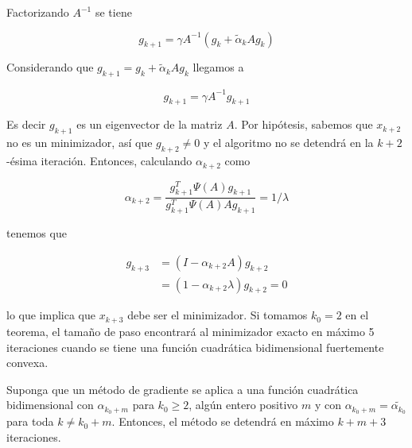 Factorizando $A^{-1}$ se tiene

\begin{equation*}
    g_{k+1} = \gamma A^{-1}(g_k+\tilde{\alpha}_kAg_k)
\end{equation*}

Considerando que $g_{k+1} = g_k+\tilde{\alpha}_kAg_k$ llegamos a

\begin{equation*}
    g_{k+1} = \gamma A^{-1}g_{k+1}
\end{equation*}

Es decir $g_{k+1}$ es un eigenvector de la matriz $A$. Por hipótesis, sabemos que $x_{k+2}$ no es un minimizador, así que $g_{k+2}\neq 0$ y el algoritmo no se detendrá en la $k+2$-ésima iteración. Entonces, calculando $\alpha_{k+2}$ como

\begin{equation*}
    \alpha_{k+2}= \frac{g_{k+1}^T\Psi(A)g_{k+1}}{g_{k+1}^T\Psi(A)Ag_{k+1}} = 1/\lambda
\end{equation*}

tenemos que

\begin{align*}
    g_{k+3} & = (I-\alpha_{k+2}A)g_{k+2}         \\
            & = (1-\alpha_{k+2}\lambda)g_{k+2}=0
\end{align*}

lo que implica que $x_{k+3}$ debe ser el minimizador. Si tomamos $k_0 =2$ en el teorema, el tamaño de paso encontrará al minimizador exacto en máximo 5 iteraciones cuando se tiene una función cuadrática bidimensional fuertemente convexa.

\begin{corollary}
Suponga que un método de gradiente se aplica a una función cuadrática bidimensional con $\alpha_{k_0+m}$ para $k_0\geq 2$, algún entero positivo $m$ y con $\alpha_{k_0+m}= \tilde{\alpha_{k_0}}$ para toda $k\neq k_0+m$. Entonces, el método se detendrá en máximo $k+m+3$ iteraciones.


\end{corollary}

